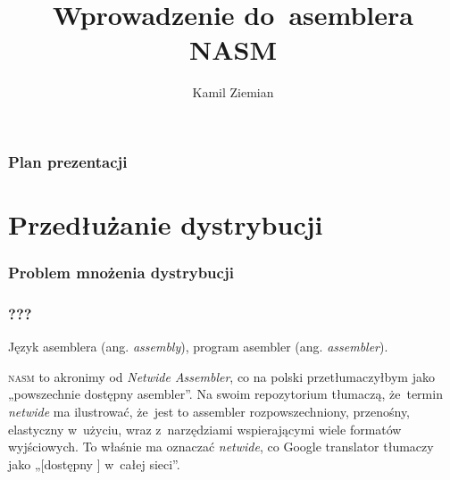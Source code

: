 \documentclass[10pt,t]{beamer}
\title{Wprowadzenie do~asemblera NASM}
\author{Kamil Ziemian \\
  \email}
\begin{document}





\RaggedRight





\maketitle





\begin{frame}
  \frametitle{Plan prezentacji}


  \tableofcontents

\end{frame}










\section{Przedłużanie dystrybucji}



\begin{frame}
  \frametitle{Problem mnożenia dystrybucji}




\end{frame}





\begin{frame}
  \frametitle{???}


  Język asemblera (ang. \textit{assembly}), program asembler (ang.
  \textit{assembler}).

  \textsc{nasm} to akronimy od \textit{Netwide Assembler}, co na polski
  przetłumaczyłbym jako „powszechnie dostępny asembler”. Na swoim
  repozytorium
   tłumaczą,
  że~termin \textit{netwide} ma ilustrować, że~jest to assembler
  rozpowszechniony, przenośny, elastyczny w~użyciu, wraz z~narzędziami
  wspierającymi wiele formatów wyjściowych. To właśnie ma oznaczać
  \textit{netwide}, co Google translator tłumaczy jako „[dostępny ] w~całej
  sieci”.

\end{frame}
\end{document}
